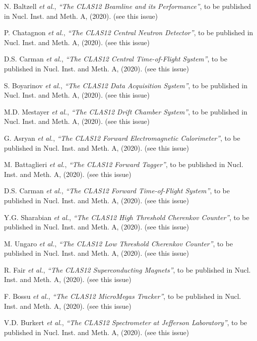 \begin{thebibliography}{99}

N. Baltzell {\it et al.}, {\it ``The CLAS12 Beamline and its Performance''}, to be published in Nucl. Inst.
and Meth. A, (2020). (see this issue)
  
P. Chatagnon {\it et al.}, {\it ``The CLAS12 Central Neutron Detector''}, to be published in Nucl. Inst.
and Meth. A, (2020). (see this issue)
  
D.S. Carman {\it et al.}, {\it ``The CLAS12 Central Time-of-Flight System''}, to be published in Nucl. Inst.
and Meth. A, (2020). (see this issue)
  
S. Boyarinov {\it et al.}, {\it ``The CLAS12 Data Acquisition System''}, to be published in Nucl. Inst.
and Meth. A, (2020). (see this issue)
  
M.D. Mestayer {\it et al.}, {\it ``The CLAS12 Drift Chamber System''}, to be published in Nucl. Inst.
and Meth. A, (2020). (see this issue)
  
G. Asryan {\it et al.}, {\it ``The CLAS12 Forward Electromagnetic Calorimeter''}, to be published in Nucl. Inst.
and Meth. A, (2020). (see this issue)
  
M. Battaglieri {\it et al.}, {\it ``The CLAS12 Forward Tagger''}, to be published in Nucl. Inst.
and Meth. A, (2020). (see this issue)
  
D.S. Carman {\it et al.}, {\it ``The CLAS12 Forward Time-of-Flight System''}, to be published in Nucl. Inst.
and Meth. A, (2020). (see this issue)
  
Y.G. Sharabian {\it et al.}, {\it ``The CLAS12 High Threshold Cherenkov Counter''}, to be published in Nucl. Inst.
and Meth. A, (2020). (see this issue)
  
M. Ungaro {\it et al.}, {\it ``The CLAS12 Low Threshold Cherenkov Counter''}, to be published in Nucl. Inst.
and Meth. A, (2020). (see this issue)
  
R. Fair {\it et al.}, {\it ``The CLAS12 Superconducting Magnets''}, to be published in Nucl. Inst.
and Meth. A, (2020). (see this issue)
  
F. Bossu {\it et al.}, {\it ``The CLAS12 MicroMegas Tracker''}, to be published in Nucl. Inst.
and Meth. A, (2020). (see this issue)
  
V.D. Burkert {\it et al.}, {\it ``The CLAS12 Spectrometer at Jefferson Laboratory''}, to be published in Nucl. Inst.
and Meth. A, (2020). (see this issue)
  

\end{thebibliography}
